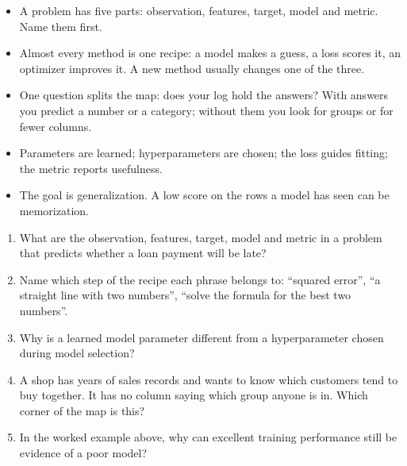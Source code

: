 \begin{chapterrecap}
\begin{itemize}
  \item A problem has five parts: observation, features, target, model and metric. Name them first.
  \item Almost every method is one recipe: a model makes a guess, a loss scores it, an optimizer improves it. A new method usually changes one of the three.
  \item One question splits the map: does your log hold the answers? With answers you predict a number or a category; without them you look for groups or for fewer columns.
  \item Parameters are learned; hyperparameters are chosen; the loss guides fitting; the metric reports usefulness.
  \item The goal is generalization. A low score on the rows a model has seen can be memorization.
\end{itemize}
\end{chapterrecap}

\begin{quickcheck}
\begin{enumerate}
  \item What are the observation, features, target, model and metric in a problem that predicts whether a loan payment will be late?
  \item Name which step of the recipe each phrase belongs to: ``squared error'', ``a straight line with two numbers'', ``solve the formula for the best two numbers''.
  \item Why is a learned model parameter different from a hyperparameter chosen during model selection?
  \item A shop has years of sales records and wants to know which customers tend to buy together. It has no column saying which group anyone is in. Which corner of the map is this?
  \item In the worked example above, why can excellent training performance still be evidence of a poor model?
\end{enumerate}
\end{quickcheck}
